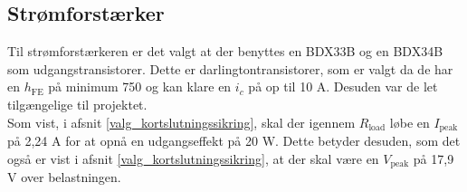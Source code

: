 \subsection*{Strømforstærker}
\label{effekt_stroemforstaerker}
Til strømforstærkeren er det valgt at der benyttes en BDX33B og en BDX34B  som udgangstransistorer. Dette er darlingtontransistorer, som er valgt da de har en $h_{\mathrm{FE}}$ på minimum 750 og kan klare en $i_c$ på op til 10 A. Desuden var de let tilgængelige til projektet.\\
Som vist, i afsnit \ref{valg_kortslutningssikring}, skal der igennem $R_{\mathrm{load}}$ løbe en $I_{\mathrm{peak}}$ på 2,24 A for at opnå en udgangseffekt på 20 W. Dette betyder desuden, som det også er vist i afsnit \ref{valg_kortslutningssikring}, at der skal være en $V_{\mathrm{peak}}$ på 17,9 V over belastningen. %
